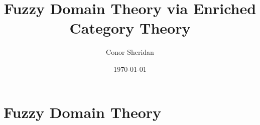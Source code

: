 \documentclass[oneside]{book}
\title{Fuzzy Domain Theory via Enriched Category Theory}
\author{Conor Sheridan}
\date{\today}
\begin{document}
    \maketitle
    \tableofcontents

    

    \part{Fuzzy Domain Theory}
    

    \printbibliography
\end{document}
